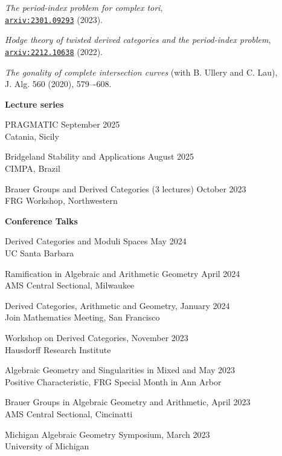 \documentclass[11 pt]{letter}
\begin{document}
	\emph{The period-index problem for complex tori}, \\
	\indent \href{https://arxiv.org/abs/2301.09293}{\nolinkurl{arxiv:2301.09293}} (2023).

	\emph{Hodge theory of twisted derived categories and the period-index problem}, \\ 
	\indent \href{https://arxiv.org/abs/2212.10638}{\nolinkurl{arxiv:2212.10638}} (2022).

	\emph{The gonality of complete intersection curves} (with B. Ullery and C. Lau), \\
	\indent J. Alg. 560 (2020), 579–-608.


	\medskip
	\noindent
	\textbf{\large{Lecture series}}

	PRAGMATIC \hfill September 2025 \\
	\indent Catania, Sicily

	Bridgeland Stability and Applications \hfill August 2025 \\
	\indent CIMPA, Brazil

	Brauer Groups and Derived Categories (3 lectures) \hfill October 2023 \\
	\indent FRG Workshop, Northwestern

	\medskip
	\noindent
	\textbf{\large{Conference Talks}}

	Derived Categories and Moduli Spaces \hfill May 2024 \\
	\indent UC Santa Barbara

	Ramification in Algebraic and Arithmetic Geometry \hfill April 2024 \\
	\indent AMS Central Sectional, Milwaukee


	Derived Categories, Arithmetic and Geometry, \hfill January 2024 \\
	\indent Join Mathematics Meeting, San Francisco
	
	Workshop on Derived Categories, \hfill November 2023 \\
	\indent Hausdorff Research Institute

	Algebraic Geometry and Singularities in Mixed and \hfill May 2023 \\
	\indent Positive Characteristic, FRG Special Month in Ann Arbor 


	Brauer Groups in Algebraic Geometry and Arithmetic, \hfill April 2023 \\
	\indent AMS Central Sectional, Cincinatti 


	Michigan Algebraic Geometry Symposium, \hfill March 2023 \\
	\indent University of Michigan
\end{document}
